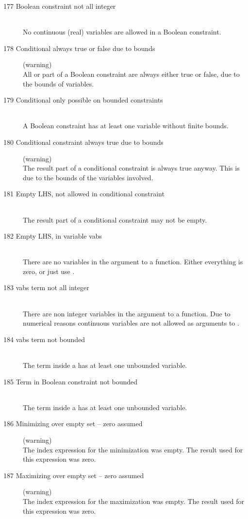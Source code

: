\begin{description}
\item[177 Boolean constraint not all integer]\ \\
   No continuous (real) variables are allowed in a Boolean constraint.
\item[178 Conditional always true or false due to bounds] (warning)\ \\
   All or part of a Boolean constraint are always either true or
   false, due to the bounds of variables.
\item[179 Conditional only possible on bounded constraints]\ \\
   A Boolean constraint has at least one variable without finite bounds.
\item[180 Conditional constraint always true due to bounds] (warning)\ \\
   The result part of a conditional constraint is always true anyway. 
   This is due to the bounds of the variables involved.
\item[181 Empty LHS, not allowed in conditional constraint]\ \\
   The result part of a conditional constraint may not be empty.
\item[182 Empty LHS, in variable vabs]\ \\
   There are no variables in the argument to a  function.
   Either everything is zero, or just use .
\item[183 vabs term not all integer]\ \\
   There are non integer variables in the argument to a  function.
   Due to numerical reasons continuous variables are not allowed as
   arguments to . 
\item[184 vabs term not bounded]\ \\
   The term inside a  has at least one unbounded variable.
\item[185 Term in Boolean constraint not bounded]\ \\
   The term inside a  has at least one unbounded variable.
%
%
\item[186 Minimizing over empty set -- zero assumed] (warning)\ \\
   The index expression for the minimization was empty. The result
   used for this expression was zero.
\item[187 Maximizing over empty set -- zero assumed] (warning)\ \\
   The index expression for the maximization was empty. The result
   used for this expression was zero.

\end{description}
